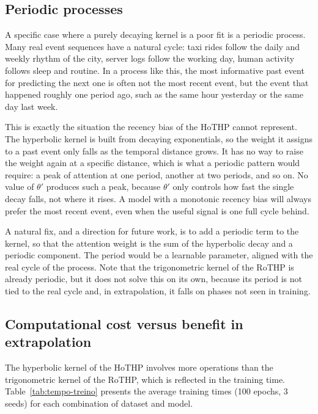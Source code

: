 \subsection{Periodic processes}
\label{subsec:eventos-periodicos}

A specific case where a purely decaying kernel is a poor fit is a periodic process. Many real event sequences have a natural cycle: taxi rides follow the daily and weekly rhythm of the city, server logs follow the working day, human activity follows sleep and routine. In a process like this, the most informative past event for predicting the next one is often not the most recent event, but the event that happened roughly one period ago, such as the same hour yesterday or the same day last week.

This is exactly the situation the recency bias of the HoTHP cannot represent. The hyperbolic kernel is built from decaying exponentials, so the weight it assigns to a past event only falls as the temporal distance grows. It has no way to raise the weight again at a specific distance, which is what a periodic pattern would require: a peak of attention at one period, another at two periods, and so on. No value of $\theta'$ produces such a peak, because $\theta'$ only controls how fast the single decay falls, not where it rises. A model with a monotonic recency bias will always prefer the most recent event, even when the useful signal is one full cycle behind.

A natural fix, and a direction for future work, is to add a periodic term to the kernel, so that the attention weight is the sum of the hyperbolic decay and a periodic component. The period would be a learnable parameter, aligned with the real cycle of the process. Note that the trigonometric kernel of the RoTHP is already periodic, but it does not solve this on its own, because its period is not tied to the real cycle and, in extrapolation, it falls on phases not seen in training.

\subsection{Computational cost versus benefit in extrapolation}
\label{subsec:custo-beneficio}

The hyperbolic kernel of the HoTHP involves more operations than the trigonometric kernel of the RoTHP, which is reflected in the training time. Table~\ref{tab:tempo-treino} presents the average training times (100 epochs, 3 seeds) for each combination of dataset and model.

